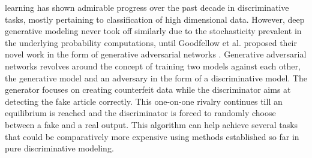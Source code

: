\documentclass[10pt,journal,compsoc]{IEEEtran}
\begin{document}




% 
% 
% 
% 
 learning has shown admirable progress over the past decade in discriminative tasks, mostly pertaining to classification of high dimensional data. However, deep generative modeling never took off similarly due to the stochasticity prevalent in the underlying probability computations, until Goodfellow et al. proposed their novel work in the form of generative adversarial networks \cite{vanillagans}. Generative adversarial networks revolves around the concept of training two models against each other, the generative model and an adversary in the form of a discriminative model. The generator focuses on creating counterfeit data while the discriminator aims at detecting the fake article correctly. This one-on-one rivalry continues till an equilibrium is reached and the discriminator is forced to randomly choose between a fake and a real output. This algorithm can help achieve several tasks that could be comparatively more expensive using methods established so far in pure discriminative modeling.
\end{document}
